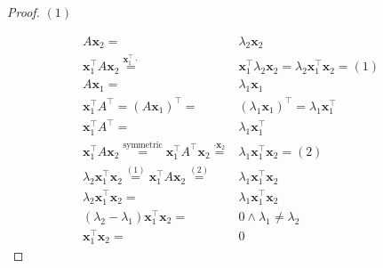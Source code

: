 \documentclass[
]{book}
\theoremstyle{definition}
\theoremstyle{definition}
\theoremstyle{definition}
\theoremstyle{definition}
\theoremstyle{remark}
\begin{document}
\begin{proof}
\(\left(1\right)\)

\[
\begin{aligned}
A\boldsymbol{x}_{2}= & \lambda_{2}\boldsymbol{x}_{2}\\
\boldsymbol{x}_{1}^{\intercal}A\boldsymbol{x}_{2}\overset{\boldsymbol{x}_{1}^{\intercal}\cdot}{=} & \boldsymbol{x}_{1}^{\intercal}\lambda_{2}\boldsymbol{x}_{2}=\lambda_{2}\boldsymbol{x}_{1}^{\intercal}\boldsymbol{x}_{2}=\left(1\right)\\
A\boldsymbol{x}_{1}= & \lambda_{1}\boldsymbol{x}_{1}\\
\boldsymbol{x}_{1}^{\intercal}A^{\intercal}=\left(A\boldsymbol{x}_{1}\right)^{\intercal}= & \left(\lambda_{1}\boldsymbol{x}_{1}\right)^{\intercal}=\lambda_{1}\boldsymbol{x}_{1}^{\intercal}\\
\boldsymbol{x}_{1}^{\intercal}A^{\intercal}= & \lambda_{1}\boldsymbol{x}_{1}^{\intercal}\\
\boldsymbol{x}_{1}^{\intercal}A\boldsymbol{x}_{2}\overset{\text{symmetric}}{=}\boldsymbol{x}_{1}^{\intercal}A^{\intercal}\boldsymbol{x}_{2}\overset{\cdot\boldsymbol{x}_{2}}{=} & \lambda_{1}\boldsymbol{x}_{1}^{\intercal}\boldsymbol{x}_{2}=\left(2\right)\\
\lambda_{2}\boldsymbol{x}_{1}^{\intercal}\boldsymbol{x}_{2}\overset{\left(1\right)}{=}\boldsymbol{x}_{1}^{\intercal}A\boldsymbol{x}_{2}\overset{\left(2\right)}{=} & \lambda_{1}\boldsymbol{x}_{1}^{\intercal}\boldsymbol{x}_{2}\\
\lambda_{2}\boldsymbol{x}_{1}^{\intercal}\boldsymbol{x}_{2}= & \lambda_{1}\boldsymbol{x}_{1}^{\intercal}\boldsymbol{x}_{2}\\
\left(\lambda_{2}-\lambda_{1}\right)\boldsymbol{x}_{1}^{\intercal}\boldsymbol{x}_{2}= & 0\wedge\lambda_{1}\ne\lambda_{2}\\
\boldsymbol{x}_{1}^{\intercal}\boldsymbol{x}_{2}= & 0
\end{aligned}
\]
\end{proof}
\end{document}

